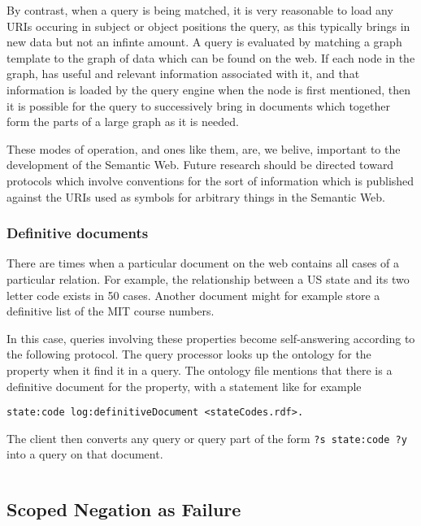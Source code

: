 \documentclass{tlp}
\begin{document}
\par By contrast, when a query is being matched, it is very
reasonable to load any URIs occuring in subject or object positions
the query, as this typically brings in new data but not an infinte
amount. A query is evaluated by matching a graph template to the
graph of data which can be found on the web. If each node in the
graph, has useful and relevant information associated with it, and
that information is loaded by the query engine when the node is
first mentioned, then it is possible for the query to successively
bring in documents which together form the parts of a large graph
as it is needed.

\par These modes of operation, and ones like them, are, we belive,
important to the development of the Semantic Web. Future research
should be directed toward protocols which involve conventions for
the sort of information which is published against the URIs used as
symbols for arbitrary things in the Semantic Web.
\subsubsection{Definitive documents}
  

\par There are times when a particular document on the web contains
all cases of a particular relation. For example, the relationship
between a US state and its two letter code exists in 50 cases.
Another document might for example store a definitive list of the
MIT course numbers.

\par In this case, queries involving these properties become
self-answering according to the following protocol. The query
processor looks up the ontology for the property when it find it in
a query. The ontology file mentions that there is a definitive
document for the property, with a statement like for example
\begin{verbatim}
state:code log:definitiveDocument <stateCodes.rdf>.
\end{verbatim}

\par The client then converts any query or query part of the form
{\tt ?s state:code ?y} into a query on that document.
\begin{verbatim}

\end{verbatim}

\subsection{Scoped Negation as Failure}
  \label{neg23}
\end{document}
